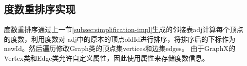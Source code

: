 \documentclass[master]{thesis-uestc}
\begin{document}
\subsection{度数重排序实现}
\label{subsec:degree-sort-impl}
    度数重排序通过上一节\ref{subsec:simplification-impl}生成的邻接表adj计算每个顶点的度数，利用度数对
adj中的原本的顶点oldId进行排序，将排序后的下标作为newId。然后遍历修改Graph类的顶点集vertices和边集edges。
由于GraphX的Vertex类和Edge类允许自定义属性，因此使用属性来存储度数信息。
\begin{table}
    \caption{度数重排序相关变量}
    \label{tab:class-reorder}
\end{table}
\end{document}
